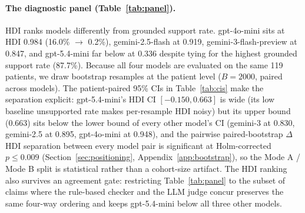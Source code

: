 \documentclass{article}
\theoremstyle{plain}
\begin{document}
\paragraph{The diagnostic panel (Table~\ref{tab:panel}).}
HDI ranks models differently from grounded support rate. gpt-4o-mini sits at HDI 0.984 (16.0\% $\to$ 0.2\%), gemini-2.5-flash at 0.919, gemini-3-flash-preview at 0.847, and gpt-5.4-mini far below at 0.336 despite tying for the highest grounded support rate (87.7\%). Because all four models are evaluated on the same 119 patients, we draw bootstrap resamples at the patient level ($B{=}2000$, paired across models). The patient-paired 95\% CIs in Table~\ref{tab:cis} make the separation explicit: gpt-5.4-mini's HDI CI $[-0.150, 0.663]$ is wide (its low baseline unsupported rate makes per-resample HDI noisy) but its upper bound (0.663) sits below the lower bound of every other model's CI (gemini-3 at 0.830, gemini-2.5 at 0.895, gpt-4o-mini at 0.948), and the pairwise paired-bootstrap $\Delta$HDI separation between every model pair is significant at Holm-corrected $p \leq 0.009$ (Section~\ref{sec:positioning}, Appendix~\ref{app:bootstrap}), so the Mode A / Mode B split is statistical rather than a cohort-size artifact. The HDI ranking also survives an agreement gate: restricting Table~\ref{tab:panel} to the subset of claims where the rule-based checker and the LLM judge concur preserves the same four-way ordering and keeps gpt-5.4-mini below all three other models.
\end{document}
